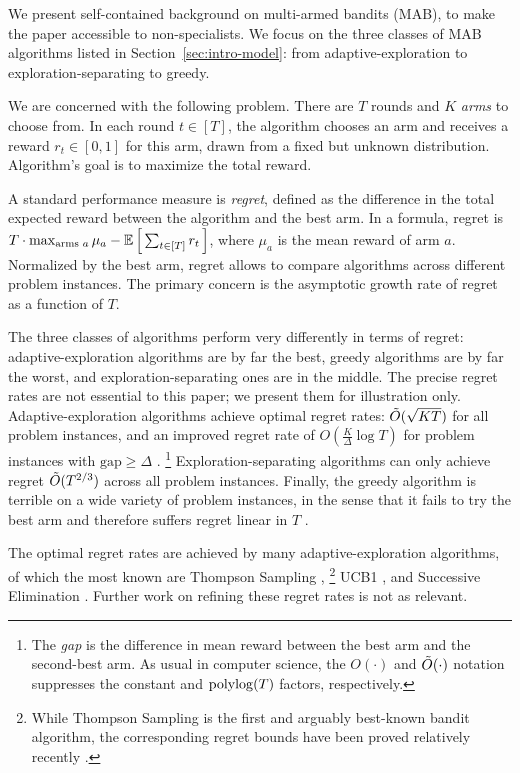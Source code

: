We present self-contained background on multi-armed bandits (MAB), to make the paper accessible to non-specialists. We focus on the three classes of MAB algorithms listed in Section~\ref{sec:intro-model}: from adaptive-exploration to exploration-separating to greedy.

We are concerned with the following problem. There are $T$ rounds and $K$ \emph{arms} to choose from. In each round $t\in [T]$, the algorithm chooses an arm and receives a reward $r_t\in[0,1]$ for this arm, drawn from a fixed but unknown distribution. Algorithm's goal is to maximize the total reward.

A standard performance measure is \emph{regret}, defined as the difference in the total expected reward between the algorithm and the best arm. In a formula, regret is
    $T\cdot \max_{\text{arms $a$}}\mu_a
    -  \E\sbr{ \sum_{t\in[T]} r_t }$,
where $\mu_a$ is the mean reward of arm $a$.
Normalized by the best arm, regret allows to compare algorithms across different problem instances.
The primary concern is the asymptotic growth rate of regret as a function of $T$.

The three classes of algorithms perform very differently in terms of regret: adaptive-exploration algorithms are by far the best, greedy algorithms are by far the worst, and exploration-separating ones are in the middle. The precise regret rates are not essential to this paper; we present them for illustration only. Adaptive-exploration algorithms achieve optimal regret rates:
    $\tilde{O}(\sqrt{KT})$
for all problem instances, and an improved regret rate of
    $O(\tfrac{K}{\Delta}\log T)$
for problem instances with $\text{gap}\geq \Delta$
\citep{Lai-Robbins-85,bandits-ucb1,bandits-exp3}.%
\footnote{The \emph{gap} is the difference in mean reward between the best arm and the second-best arm. As usual in computer science, the $O(\cdot)$ and $\tilde{O}(\cdot)$ notation suppresses the constant and
$\polylog(T)$ factors, respectively.}
Exploration-separating algorithms can only achieve regret $\tilde{O}(T^{2/3})$ across all problem instances. Finally, the greedy algorithm is terrible on a wide variety of problem instances, in the sense that it fails to try the best arm and therefore suffers regret linear in $T$
\citep[see Chapter 11.2 in][]{slivkins-MABbook}.


The optimal regret rates are achieved by many adaptive-exploration  algorithms, of which the most known are
Thompson Sampling \citep{Thompson-1933,TS-survey-FTML18},%
\footnote{While Thompson Sampling is the first and arguably best-known bandit algorithm, the corresponding regret bounds have been proved relatively recently \citep{Shipra-colt12,Kaufmann-alt12,Shipra-aistats13}.}
UCB1 \citep{bandits-ucb1},
and Successive Elimination \citep{EvenDar-icml06}.
Further work on refining these regret rates is not as relevant.

